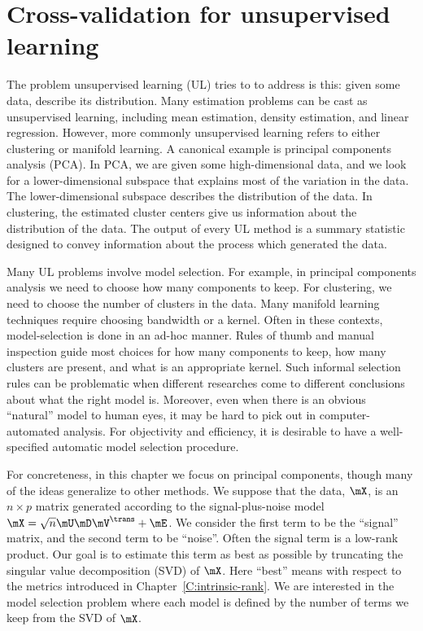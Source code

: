 
\chapter{Cross-validation for unsupervised learning}

The problem unsupervised learning (UL) tries to to address is this: given some
data, describe its distribution. Many estimation problems can be cast as
unsupervised learning, including mean estimation, density estimation, and
linear regression. However, more commonly unsupervised learning refers to
either clustering or manifold learning. A canonical example is principal
components analysis (PCA). In PCA, we are given some high-dimensional data,
and we look for a lower-dimensional subspace that explains most of the
variation in the data. The lower-dimensional subspace describes the
distribution of the data. In clustering, the estimated cluster centers give us
information about the distribution of the data. The output of every UL method
is a summary statistic designed to convey information about the process which
generated the data.

Many UL problems involve model selection. For example, in principal components
analysis we need to choose how many components to keep. For clustering, we
need to choose the number of clusters in the data. Many manifold learning
techniques require choosing bandwidth or a kernel. Often in these contexts,
model-selection is done in an ad-hoc manner. Rules of thumb and manual
inspection guide most choices for how many components to keep, how many
clusters are present, and what is an appropriate kernel. Such informal
selection rules can be problematic when different researches come to different
conclusions about what the right model is. Moreover, even when there is an
obvious ``natural'' model to human eyes, it may be hard to pick out in
computer-automated analysis. For objectivity and efficiency, it is desirable to have a well-specified automatic model selection procedure.

For concreteness, in this chapter we focus on principal components, though
many of the ideas generalize to other methods. We suppose that the data,
$\mX$, is an $n \times p$ matrix generated according to the signal-plus-noise
model $\mX = \sqrt{n} \mU \mD \mV^\trans + \mE$. We consider the first term to
be the ``signal'' matrix, and the second term to be ``noise''. Often the
signal term is a low-rank product. Our goal is to estimate this term as
best as possible by truncating the singular value decomposition (SVD) of
$\mX$. Here ``best'' means with respect to the metrics introduced in
Chapter~\ref{C:intrinsic-rank}. We are interested in the model selection
problem where each model is defined by the number of terms we keep from the
SVD of $\mX$.

